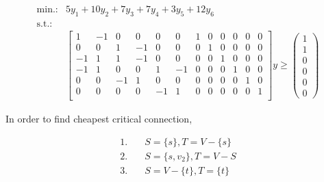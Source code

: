 \documentclass{article}
\begin{document}
\[
\begin{array}{cl}
\textrm{min.:} & 5y_1 + 10y_2 + 7y_3 + 7y_4 + 3y_5 + 12y_6\\
\textrm{s.t.:} & \\
& \begin{bmatrix}%
  1 & -1 & 0 &  0 & 0 & 0 & 1 & 0 & 0 & 0 & 0 & 0\\
  0 &  0 & 1 & -1 & 0 & 0 & 0 & 1 & 0 & 0 & 0 & 0\\
 -1 & 1 & 1 & -1 & 0 & 0 & 0 & 0 & 1 & 0 & 0 & 0\\
 -1 & 1 & 0 & 0 & 1 & -1 & 0 & 0 & 0 & 1 & 0 & 0\\
 0 & 0 & -1 & 1 & 0 & 0 & 0 & 0 & 0 & 0 & 1 & 0\\
 0 & 0 & 0 & 0 & -1 & 1 & 0 & 0 & 0 & 0 & 0 & 1\\
\end{bmatrix}y
\geq
\begin{pmatrix}
  1\\ 1\\ 0\\ 0\\ 0\\ 0
\end{pmatrix}
\end{array}
\]

In order to find cheapest critical connection, 

\begin{align*}
  1.&\quad S = \{s\}, T = V - \{s\}\\
  2.&\quad S = \{s,v_2\}, T = V - S\\
  3.&\quad S = V - \{t\}, T = \{t\}
\end{align*}


\vfill
 
\end{document}
